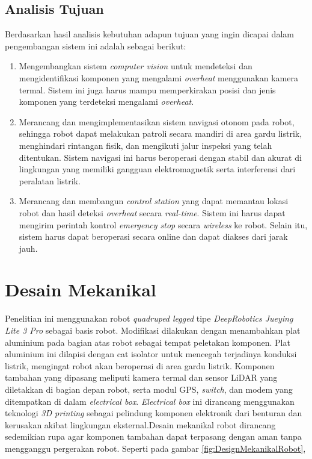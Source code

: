 \subsection{Analisis Tujuan}
Berdasarkan hasil analisis kebutuhan adapun tujuan yang ingin dicapai dalam pengembangan sistem ini adalah sebagai berikut:
\begin{enumerate}
  \item Mengembangkan sistem \emph{computer vision} untuk mendeteksi dan mengidentifikasi komponen yang mengalami \emph{overheat} menggunakan kamera termal. Sistem ini juga harus mampu memperkirakan posisi dan jenis komponen yang terdeteksi mengalami \emph{overheat}.
  \item Merancang dan mengimplementasikan sistem navigasi otonom pada robot, sehingga robot dapat melakukan patroli secara mandiri di area gardu listrik, menghindari rintangan fisik, dan mengikuti jalur inspeksi yang telah ditentukan. Sistem navigasi ini harus beroperasi dengan stabil dan akurat di lingkungan yang memiliki gangguan elektromagnetik serta interferensi dari peralatan listrik.
  \item Merancang dan membangun \emph{control station} yang dapat memantau lokasi robot dan hasil deteksi \emph{overheat} secara \emph{real-time}. Sistem ini harus dapat mengirim perintah kontrol \emph{emergency stop} secara \emph{wireless} ke robot. Selain itu, sistem harus dapat beroperasi secara online dan dapat diakses dari jarak jauh.
\end{enumerate}

\section{Desain Mekanikal}
Penelitian ini menggunakan robot \emph{quadruped legged} tipe \emph{DeepRobotics Jueying Lite 3 Pro} sebagai basis robot. Modifikasi dilakukan dengan menambahkan plat aluminium pada bagian atas robot sebagai tempat peletakan komponen. Plat aluminium ini dilapisi dengan cat isolator untuk mencegah terjadinya konduksi listrik, mengingat robot akan beroperasi di area gardu listrik.  Komponen tambahan yang dipasang meliputi kamera termal dan sensor LiDAR yang diletakkan di bagian depan robot, serta modul GPS, \emph{switch}, dan modem yang ditempatkan di dalam \emph{electrical box}. \emph{Electrical box} ini dirancang menggunakan teknologi \emph{3D printing} sebagai pelindung komponen elektronik dari benturan dan kerusakan akibat lingkungan eksternal.Desain mekanikal robot dirancang sedemikian rupa agar komponen tambahan dapat terpasang dengan aman tanpa mengganggu pergerakan robot. Seperti pada gambar \ref{fig:DesignMekanikalRobot},

